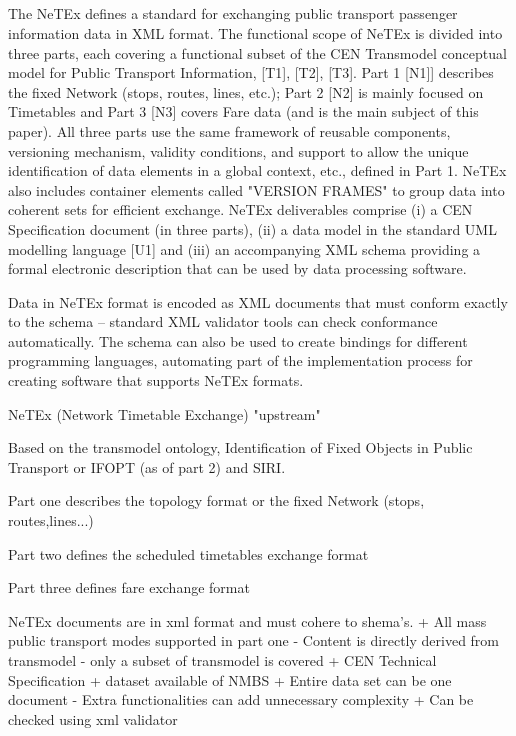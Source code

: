 \subsection{}
The NeTEx defines a standard for exchanging public transport passenger information data in XML format. The functional
scope of NeTEx is divided into three parts, each covering a functional subset of the CEN Transmodel conceptual
model for Public Transport Information, [T1], [T2], [T3].
Part 1 [N1]] describes the fixed Network (stops, routes, lines, etc.); Part 2 [N2] is mainly focused on Timetables and
Part 3 [N3] covers Fare data (and is the main subject of this paper). All three parts use the same framework of reusable
components, versioning mechanism, validity conditions, and support to allow the unique identification of data elements
in a global context, etc., defined in Part 1. NeTEx also includes container elements called "VERSION FRAMES"
to group data into coherent sets for efficient exchange.
NeTEx deliverables comprise (i) a CEN Specification document (in three parts), (ii) a data model in the standard UML
modelling language [U1] and (iii) an accompanying XML schema providing a formal electronic description that can
be used by data processing software.

Data in NeTEx format is encoded as XML documents that must conform exactly to the schema – standard XML validator tools can check conformance automatically. The schema can also be used to create bindings for different
programming languages, automating part of the implementation process for creating software that supports NeTEx
formats. 

NeTEx (Network Timetable Exchange)
"upstream"

Based on the transmodel ontology, Identification of Fixed Objects in Public Transport or IFOPT (as of part 2) and SIRI.

Part one describes the topology format or the fixed Network (stops, routes,lines...)

Part two defines the scheduled timetables exchange format

Part three defines fare exchange format

NeTEx documents are in xml format and must cohere to shema's.
+ All mass public transport modes supported in part one
- Content is directly derived from transmodel
- only a subset of transmodel is covered
+ CEN Technical Specification
+ dataset available of NMBS
+ Entire data set can be one document
- Extra functionalities can add unnecessary complexity
+ Can be checked using xml validator


